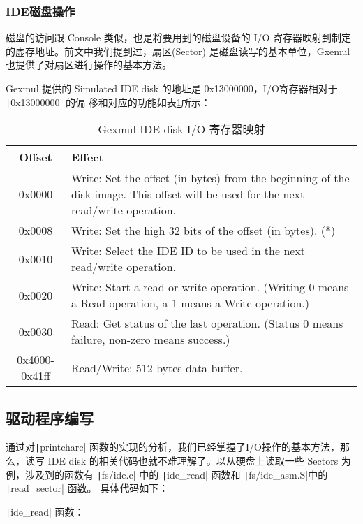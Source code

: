 \subsubsection{IDE磁盘操作}

磁盘的访问跟 Console 类似，也是将要用到的磁盘设备的 I/O 寄存器映射到制定的虚存地址。前文中我们提到过，扇区(Sector)
是磁盘读写的基本单位，Gxemul 也提供了对扇区进行操作的基本方法。

Gexmul 提供的 Simulated IDE disk 的地址是 0x13000000，I/O寄存器相对于 \texttt|0x13000000| 的偏
移和对应的功能如表\ref{lab5-table-disk-mem-map}所示：

\begin{table}[htbp]
\caption{Gexmul IDE disk I/O 寄存器映射}\label{lab5-table-disk-mem-map}
\centering
\begin{tabular}{|c|p{12cm}|}
  \hline
    Offset & Effect \\
  \hline
    0x0000 & Write: Set the offset (in bytes) from the beginning of the disk image. This offset will be used for the next read/write operation. \\
  \hline
    0x0008 & Write: Set the high 32 bits of the offset (in bytes). (*) \\
  \hline
    0x0010 & Write: Select the IDE ID to be used in the next read/write operation. \\
  \hline
    0x0020 & Write: Start a read or write operation. (Writing 0 means a Read operation, a 1 means a Write operation.) \\
  \hline
    0x0030 & Read: Get status of the last operation. (Status 0 means failure, non-zero means success.) \\
  \hline
    0x4000-0x41ff  &  Read/Write: 512 bytes data buffer. \\
  \hline
\end{tabular}
\end{table}

\subsection{驱动程序编写}

通过对\texttt|printcharc| 函数的实现的分析，我们已经掌握了I/O操作的基本方法，那么，读写 IDE disk 
的相关代码也就不难理解了。以从硬盘上读取一些 Sectors 为例，涉及到的函数有 \texttt|fs/ide.c| 中的 
\texttt|ide_read| 函数和 \texttt|fs/ide_asm.S|中的 \texttt|read_sector| 函数。
具体代码如下：

\texttt|ide_read| 函数：

